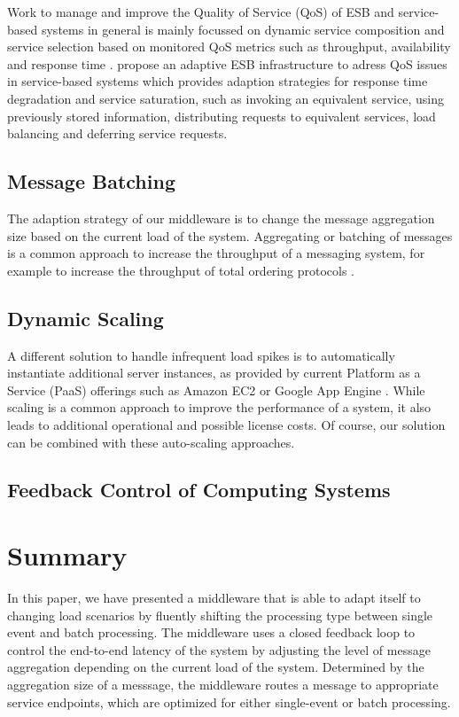 Work to manage and improve the Quality of Service (QoS) of ESB and service-based systems in general is mainly focussed on dynamic service composition and service selection based on monitored QoS metrics such as throughput, availability and response time \citep{Calinescu:2011aa}. \cite{Gonzalez:2011} propose an adaptive ESB infrastructure to adress QoS issues in service-based systems which provides adaption strategies for response time degradation and service saturation, such as invoking an equivalent service, using previously stored information, distributing requests to equivalent services, load balancing and deferring service requests.

\subsection{Message Batching}
The adaption strategy of our middleware is to change the message aggregation size based on the current load of the system. Aggregating or batching of messages is a common approach to increase the throughput of a messaging system, for example to increase the throughput of total ordering protocols \citep{Friedman:1997aa} \citep{Friedman:2006aa} \citep{Romano:2012aa} \citep{Didona:2012aa}.


\subsection{Dynamic Scaling}
A different solution to handle infrequent load spikes is to automatically instantiate additional server instances, as provided by current Platform as a Service (PaaS) offerings such as Amazon EC2 \citep{ec2_autoscaling} or Google App Engine \citep{google_cloud_autoscaling}. While scaling is a common approach to improve the performance of a system, it also leads to additional operational and possible license costs. Of course, our solution can be combined with these auto-scaling approaches.

\subsection{Feedback Control of Computing Systems}

\section{Summary}\label{sec:ch5_summary}
In this paper, we have presented a middleware that is able to adapt itself to changing load scenarios by fluently shifting the processing type between single event and batch processing. The middleware uses a closed feedback loop to control the end-to-end latency of the system by adjusting the level of message aggregation depending on the current load of the system. Determined by the aggregation size of a messsage, the middleware routes a message to appropriate service endpoints, which are optimized for either single-event or batch processing.

